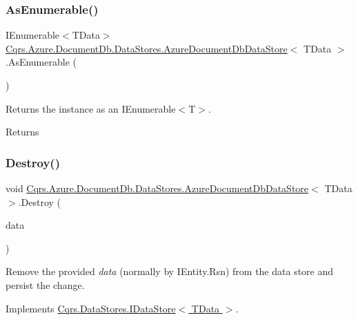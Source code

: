 \subsubsection{\texorpdfstring{As\+Enumerable()}{AsEnumerable()}}
{\footnotesize\ttfamily I\+Enumerable$<$T\+Data$>$ \hyperlink{classCqrs_1_1Azure_1_1DocumentDb_1_1DataStores_1_1AzureDocumentDbDataStore}{Cqrs.\+Azure.\+Document\+Db.\+Data\+Stores.\+Azure\+Document\+Db\+Data\+Store}$<$ T\+Data $>$.As\+Enumerable (\begin{DoxyParamCaption}{ }\end{DoxyParamCaption})}



Returns the instance as an I\+Enumerable$<$\+T$>$. 

\begin{DoxyReturn}{Returns}

\end{DoxyReturn}
\mbox{\label{classCqrs_1_1Azure_1_1DocumentDb_1_1DataStores_1_1AzureDocumentDbDataStore_affe39fe57e590555256258fa6c568c29_affe39fe57e590555256258fa6c568c29}} 
\subsubsection{\texorpdfstring{Destroy()}{Destroy()}}
{\footnotesize\ttfamily void \hyperlink{classCqrs_1_1Azure_1_1DocumentDb_1_1DataStores_1_1AzureDocumentDbDataStore}{Cqrs.\+Azure.\+Document\+Db.\+Data\+Stores.\+Azure\+Document\+Db\+Data\+Store}$<$ T\+Data $>$.Destroy (\begin{DoxyParamCaption}\item[{T\+Data}]{data }\end{DoxyParamCaption})}



Remove the provided {\itshape data}  (normally by I\+Entity.\+Rsn) from the data store and persist the change. 



Implements \hyperlink{interfaceCqrs_1_1DataStores_1_1IDataStore_aa7ade96f2f3151d5353cf7bdbb2baec5_aa7ade96f2f3151d5353cf7bdbb2baec5}{Cqrs.\+Data\+Stores.\+I\+Data\+Store$<$ T\+Data $>$}.

